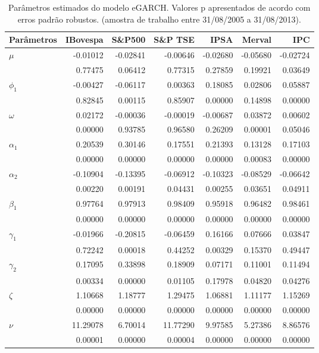 \begin{table}[H]
\centering
\caption{Par\^ametros estimados do modelo eGARCH. Valores p apresentados 
               de acordo com erros padrão robustos. (amostra de trabalho entre 31/08/2005 a 31/08/2013).} 
\label{tab:garchcoef}
\begin{tabular}{lrrrrrr}
  \hline
Parâmetros & IBovespa & S\&P500 & S\&P TSE & IPSA & Merval & IPC \\ 
  \hline
$\mu$ & -0.01012 & -0.02841 & -0.00646 & -0.02680 & -0.05680 & -0.02724 \\ 
   & 0.77475 & 0.06412 & 0.77315 & 0.27859 & 0.19921 & 0.03649 \\ 
  $\phi_1$ & -0.00427 & -0.06117 & 0.00363 & 0.18085 & 0.02806 & 0.05887 \\ 
   & 0.82845 & 0.00115 & 0.85907 & 0.00000 & 0.14898 & 0.00000 \\ 
  $\omega$ & 0.02172 & -0.00036 & -0.00019 & -0.00687 & 0.03872 & 0.00602 \\ 
   & 0.00000 & 0.93785 & 0.96580 & 0.26209 & 0.00001 & 0.05046 \\ 
  $\alpha_1$ & 0.20539 & 0.30146 & 0.17551 & 0.21393 & 0.13128 & 0.17103 \\ 
   & 0.00000 & 0.00000 & 0.00000 & 0.00000 & 0.00083 & 0.00000 \\ 
  $\alpha_2$ & -0.10904 & -0.13395 & -0.06912 & -0.10323 & -0.08529 & -0.06642 \\ 
   & 0.00220 & 0.00191 & 0.04431 & 0.00255 & 0.03651 & 0.04911 \\ 
  $\beta_1$ & 0.97764 & 0.97913 & 0.98409 & 0.95918 & 0.96482 & 0.98461 \\ 
   & 0.00000 & 0.00000 & 0.00000 & 0.00000 & 0.00000 & 0.00000 \\ 
  $\gamma_1$ & -0.01966 & -0.20815 & -0.06459 & 0.16166 & 0.07666 & 0.03847 \\ 
   & 0.72242 & 0.00018 & 0.44252 & 0.00329 & 0.15370 & 0.49447 \\ 
  $\gamma_2$ & 0.17095 & 0.33898 & 0.18909 & 0.07171 & 0.11001 & 0.11494 \\ 
   & 0.00334 & 0.00000 & 0.01105 & 0.17978 & 0.04820 & 0.04276 \\ 
  $\zeta$ & 1.10668 & 1.18777 & 1.29475 & 1.06881 & 1.11177 & 1.15269 \\ 
   & 0.00000 & 0.00000 & 0.00000 & 0.00000 & 0.00000 & 0.00000 \\ 
  $\nu$ & 11.29078 & 6.70014 & 11.77290 & 9.97585 & 5.27386 & 8.86576 \\ 
   & 0.00001 & 0.00000 & 0.00004 & 0.00000 & 0.00000 & 0.00000 \\ 
   \hline
\end{tabular}
\end{table}
